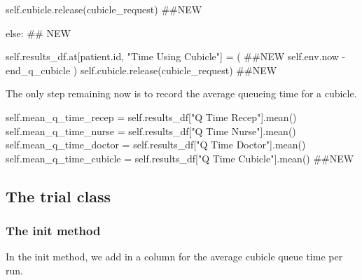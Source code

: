 \documentclass[
  letterpaper,
  DIV=11,
  numbers=noendperiod]{scrreprt}
\newenvironment{Shaded}{\begin{snugshade}}{\end{snugshade}}
\newcommand{\BuiltInTok}[1]{\textcolor[rgb]{0.00,0.23,0.31}{#1}}
\newcommand{\CommentTok}[1]{\textcolor[rgb]{0.37,0.37,0.37}{#1}}
\newcommand{\ControlFlowTok}[1]{\textcolor[rgb]{0.00,0.23,0.31}{#1}}
\newcommand{\NormalTok}[1]{\textcolor[rgb]{0.00,0.23,0.31}{#1}}
\newcommand{\OperatorTok}[1]{\textcolor[rgb]{0.37,0.37,0.37}{#1}}
\newcommand{\StringTok}[1]{\textcolor[rgb]{0.13,0.47,0.30}{#1}}
\newcommand{\VariableTok}[1]{\textcolor[rgb]{0.07,0.07,0.07}{#1}}
\begin{document}
\begin{Shaded}
\begin{Highlighting}[]
        \VariableTok{self}\NormalTok{.cubicle.release(cubicle\_request) }\CommentTok{\#\#NEW}


\ControlFlowTok{else}\NormalTok{: }\CommentTok{\#\# NEW}

      \VariableTok{self}\NormalTok{.results\_df.at[patient.}\BuiltInTok{id}\NormalTok{, }\StringTok{"Time Using Cubicle"}\NormalTok{] }\OperatorTok{=}\NormalTok{ (  }\CommentTok{\#\#NEW}
            \VariableTok{self}\NormalTok{.env.now }\OperatorTok{{-}}\NormalTok{ end\_q\_cubicle}
\NormalTok{            )}
      \VariableTok{self}\NormalTok{.cubicle.release(cubicle\_request) }\CommentTok{\#\#NEW}
\end{Highlighting}
\end{Shaded}

The only step remaining now is to record the average queueing time for a
cubicle.

\begin{Shaded}
\begin{Highlighting}[]
\VariableTok{self}\NormalTok{.mean\_q\_time\_recep }\OperatorTok{=} \VariableTok{self}\NormalTok{.results\_df[}\StringTok{"Q Time Recep"}\NormalTok{].mean()}
\VariableTok{self}\NormalTok{.mean\_q\_time\_nurse }\OperatorTok{=} \VariableTok{self}\NormalTok{.results\_df[}\StringTok{"Q Time Nurse"}\NormalTok{].mean()}
\VariableTok{self}\NormalTok{.mean\_q\_time\_doctor }\OperatorTok{=} \VariableTok{self}\NormalTok{.results\_df[}\StringTok{"Q Time Doctor"}\NormalTok{].mean()}
\VariableTok{self}\NormalTok{.mean\_q\_time\_cubicle }\OperatorTok{=} \VariableTok{self}\NormalTok{.results\_df[}\StringTok{"Q Time Cubicle"}\NormalTok{].mean() }\CommentTok{\#\#NEW}
\end{Highlighting}
\end{Shaded}

\subsection{The trial class}\label{the-trial-class-9}

\subsubsection{\texorpdfstring{The \textbf{init}
method}{The init method}}\label{the-init-method-11}

In the init method, we add in a column for the average cubicle queue
time per run.
\end{document}
